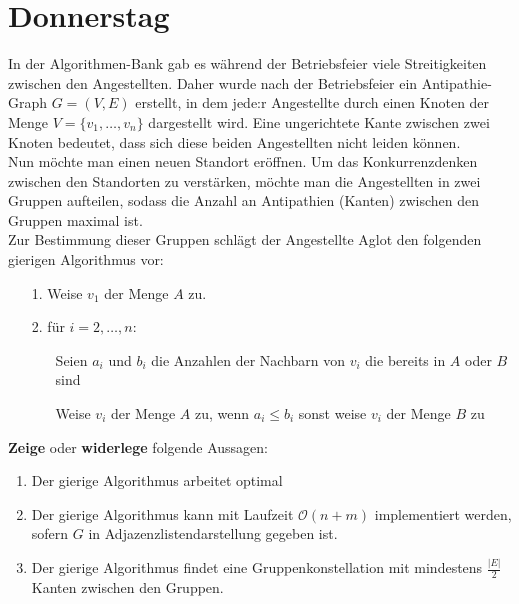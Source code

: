 \documentclass{uebung_cs}
\begin{document}
\section*{Donnerstag}
\begin{aufgabe}[Antipathien]
    In der Algorithmen-Bank gab es während der Betriebsfeier viele Streitigkeiten zwischen den Angestellten. Daher wurde nach der Betriebsfeier ein Antipathie-Graph $G=(V,E)$ erstellt, in dem jede:r Angestellte durch einen Knoten der Menge $V=\{v_1,\ldots , v_n\}$ dargestellt wird. Eine ungerichtete Kante zwischen zwei Knoten bedeutet, dass sich diese beiden Angestellten nicht leiden können.\\
    Nun möchte man einen neuen Standort eröffnen. Um das Konkurrenzdenken zwischen den Standorten zu verstärken, möchte man die Angestellten in zwei Gruppen aufteilen, sodass die Anzahl an Antipathien (Kanten) zwischen den Gruppen maximal ist.\\
    Zur Bestimmung dieser Gruppen schlägt der Angestellte Aglot den folgenden gierigen Algorithmus vor:
    \begin{enumerate}
        \item[1.] Weise $v_1$ der Menge $A$ zu.
        \item[2.] für $i=2,\ldots , n$:
        \begin{itemize}
            \item[] Seien $a_i$ und $b_i$ die Anzahlen der Nachbarn von $v_i$ die bereits in $A$ oder $B$ sind
            \item[] Weise $v_i$ der Menge $A$ zu, wenn $a_i \leq b_i$ sonst weise $v_i$ der Menge $B$ zu 
        \end{itemize}
    \end{enumerate}
    \textbf{Zeige} oder \textbf{widerlege} folgende Aussagen:
    \begin{enumerate}[label=(\alph*)]
        \item Der gierige Algorithmus arbeitet optimal
        \item Der gierige Algorithmus kann mit Laufzeit $\mathcal{O}(n+m)$ implementiert werden, sofern $G$ in Adjazenzlistendarstellung gegeben ist.
        \item Der gierige Algorithmus findet eine Gruppenkonstellation mit mindestens $\frac{|E|}{2}$ Kanten zwischen den Gruppen.
    \end{enumerate}
\end{aufgabe}
\end{document}
